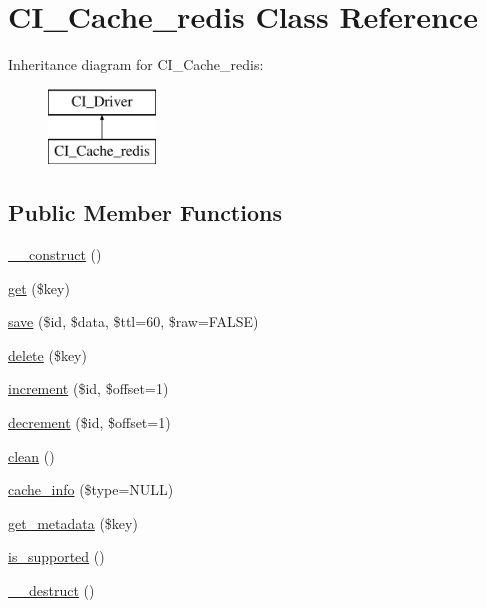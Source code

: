 \hypertarget{class_c_i___cache__redis}{}\section{C\+I\+\_\+\+Cache\+\_\+redis Class Reference}
\label{class_c_i___cache__redis}
Inheritance diagram for C\+I\+\_\+\+Cache\+\_\+redis\+:\begin{figure}[H]
\begin{center}
\leavevmode
\includegraphics[height=2.000000cm]{class_c_i___cache__redis}
\end{center}
\end{figure}
\subsection*{Public Member Functions}
\begin{DoxyCompactItemize}
\item 
\mbox{\hyperlink{class_c_i___cache__redis_a095c5d389db211932136b53f25f39685}{\+\_\+\+\_\+construct}} ()
\item 
\mbox{\hyperlink{class_c_i___cache__redis_a24a9bf83a1002d46ece83a93d14bd921}{get}} (\$key)
\item 
\mbox{\hyperlink{class_c_i___cache__redis_a472645db04a8ce4b040b789a3062a7d2}{save}} (\$id, \$data, \$ttl=60, \$raw=F\+A\+L\+SE)
\item 
\mbox{\hyperlink{class_c_i___cache__redis_aa74a2edd6f3cbb5c5353f7faa97b6d70}{delete}} (\$key)
\item 
\mbox{\hyperlink{class_c_i___cache__redis_a2f07a4e09b57f4460d49852497d1808f}{increment}} (\$id, \$offset=1)
\item 
\mbox{\hyperlink{class_c_i___cache__redis_a4eb1c2772c8efc48c411ea060dd040b7}{decrement}} (\$id, \$offset=1)
\item 
\mbox{\hyperlink{class_c_i___cache__redis_adb40b812890a8bc058bf6b7a0e1a54d9}{clean}} ()
\item 
\mbox{\hyperlink{class_c_i___cache__redis_aa8b9c4d9f0387156736ccd8850f0727e}{cache\+\_\+info}} (\$type=N\+U\+LL)
\item 
\mbox{\hyperlink{class_c_i___cache__redis_ae0041475d947465622dfcef1fc53e43d}{get\+\_\+metadata}} (\$key)
\item 
\mbox{\hyperlink{class_c_i___cache__redis_a98c68fd153468bc148c4ed8c716859fc}{is\+\_\+supported}} ()
\item 
\mbox{\hyperlink{class_c_i___cache__redis_a421831a265621325e1fdd19aace0c758}{\+\_\+\+\_\+destruct}} ()
\end{DoxyCompactItemize}
